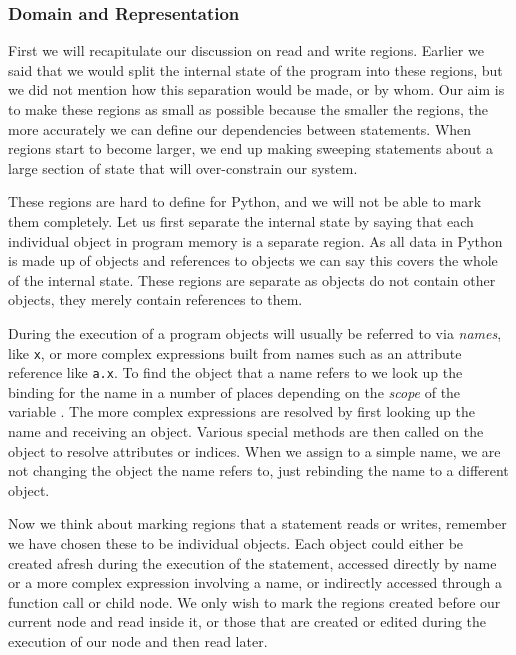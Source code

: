 \documentclass[twoside,a4paper]{report}
\begin{document}
\subsubsection{Domain and Representation}

First we will recapitulate our discussion on read and write regions. Earlier we said that we would split the internal state of the program into these regions,
but we did not mention how this separation would be made, or by whom. Our aim is to make these regions as small as possible because the smaller the regions, the
more accurately we can define our dependencies between statements. When regions start to become larger, we end up making sweeping statements about a large section
of state that will over-constrain our system.

These regions are hard to define for Python, and we will not be able to mark them completely. Let us first separate the internal state by saying that each
individual object in program memory is a separate region. As all data in Python is made up of objects and references to objects \cite{datamodel} we can say
this covers the whole of the internal state. These regions are separate as objects do not contain other objects, they merely contain references to them.

During the execution of a program objects will usually be referred to via \textit{names}, like \texttt{x}, or more complex expressions built from names such
as an attribute reference like \texttt{a.x}. To find the object that a name refers to we look up the binding for the name in a number of places depending
on the \textit{scope} of the variable \cite{namebinding}. The more complex expressions are resolved by first looking up the name and receiving an object. Various
special methods are then called on the object to resolve attributes or indices. When we assign to a simple name, we are not changing the object the name refers to,
just rebinding the name to a different object.

Now we think about marking regions that a statement reads or writes, remember we have chosen these to be individual objects. Each object could either be created
afresh during the execution of the statement, accessed directly by name or a more complex expression involving a name, or indirectly accessed through a
function call or child node. We only wish to mark the regions created before our current node and read inside it, or those that are created or edited
during the execution of our node and then read later.
\end{document}
